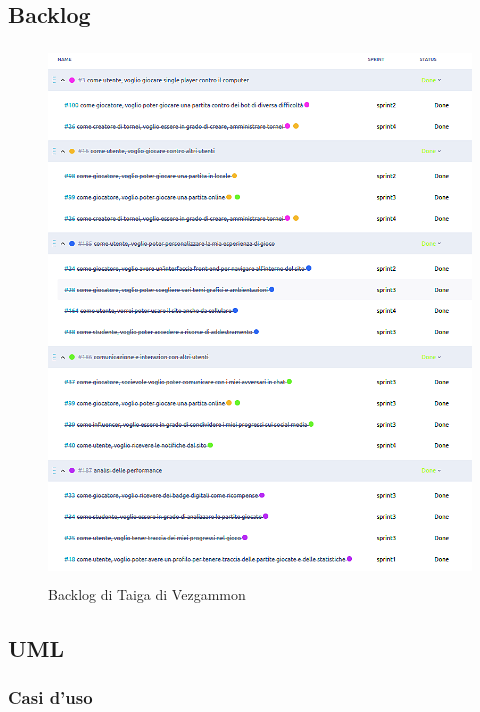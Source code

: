 \documentclass{article}
\begin{document}
\subsection{Backlog} \label{sec:bl}
\begin{figure}[H]
    \centering
    \includegraphics[width=12cm, height=14cm]{backlog}
    \caption{Backlog di Taiga di Vezgammon\textsuperscript{\texttrademark}}
    \label{fig:backlog}
\end{figure}

\subsection{UML}
\subsubsection{Casi d'uso}
\end{document}
